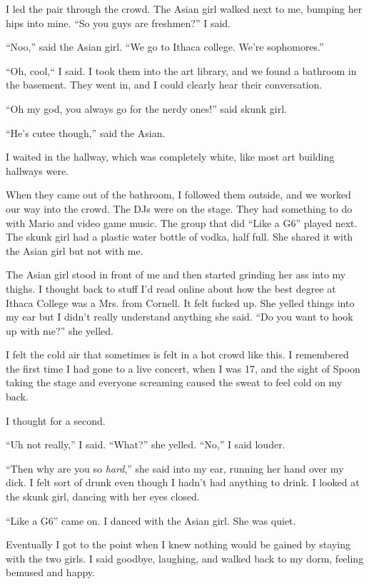 I led the pair through the crowd.  The Asian girl walked next to me, bumping
her hips into mine. ``So you guys are freshmen?'' I said.  

``Noo,'' said the Asian girl.  ``We go to Ithaca college.  We're sophomores.''

``Oh, cool,`` I said.   I took them into the art library, and we found a
bathroom in the basement.  They went in, and I could clearly hear their
conversation.

``Oh my god, you always go for the nerdy ones!'' said skunk girl.

``He's cutee though,'' said the Asian. 

I waited in the hallway, which was completely white, like most art building
hallways were.

When they came out of the bathroom, I followed them outside, and we worked our
way into the crowd.  The DJs were on the stage.  They had something to do with
Mario and video game music.  The group that did ``Like a G6'' played next.  The
skunk girl had a plastic water bottle of vodka, half full.  She shared it with
the Asian girl but not with me.

The Asian girl stood in front of me and then started grinding her ass into my
thighs.  I thought back to stuff I'd read online about how the best degree at
Ithaca College was a Mrs. from Cornell.  It felt fucked up.  She yelled things
into my ear but I didn't really understand anything she said.  ``Do you want to
hook up with me?'' she yelled.  

I felt the cold air that sometimes is felt in a hot crowd like this.  I
remembered the first time I had gone to a live concert, when I was 17, and the
sight of Spoon taking the stage and everyone screaming caused the sweat to feel
cold on my back.

I thought for a second.

``Uh not really,'' I said.  ``What?'' she yelled.  ``No,'' I said louder.

``Then why are you so \textit{hard},'' she said into my ear, running her hand
over my dick.  I felt sort of drunk even though I hadn't had anything to drink.
I looked at the skunk girl, dancing with her eyes closed.  

``Like a G6'' came on.  I danced with the Asian girl.  She was quiet.

Eventually I got to the point when I knew nothing would be gained by staying
with the two girls.  I said goodbye, laughing, and walked back to my dorm,
feeling bemused and happy. 

